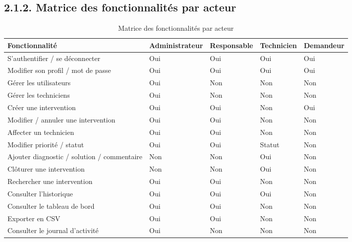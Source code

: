 \documentclass[11pt,a4paper]{report}
\begin{document}
\subsection*{2.1.2. Matrice des fonctionnalités par acteur}
\begin{table}[htbp]\centering\small
\begin{tabularx}{\textwidth}{|X|X|X|X|X|}
\hline\rowcolor{hdr}\textbf{Fonctionnalité} & \textbf{Administrateur} & \textbf{Responsable} & \textbf{Technicien} & \textbf{Demandeur}\\ \hline
S'authentifier / se déconnecter & Oui & Oui & Oui & Oui\\ \hline
Modifier son profil / mot de passe & Oui & Oui & Oui & Oui\\ \hline
Gérer les utilisateurs & Oui & Non & Non & Non\\ \hline
Gérer les techniciens & Oui & Non & Non & Non\\ \hline
Créer une intervention & Oui & Oui & Non & Oui\\ \hline
Modifier / annuler une intervention & Oui & Oui & Non & Non\\ \hline
Affecter un technicien & Oui & Oui & Non & Non\\ \hline
Modifier priorité / statut & Oui & Oui & Statut & Non\\ \hline
Ajouter diagnostic / solution / commentaire & Non & Non & Oui & Non\\ \hline
Clôturer une intervention & Non & Non & Oui & Non\\ \hline
Rechercher une intervention & Oui & Oui & Non & Non\\ \hline
Consulter l'historique & Oui & Oui & Oui & Non\\ \hline
Consulter le tableau de bord & Oui & Oui & Non & Non\\ \hline
Exporter en CSV & Oui & Oui & Non & Non\\ \hline
Consulter le journal d'activité & Oui & Non & Non & Non\\ \hline
\end{tabularx}
\caption{Matrice des fonctionnalités par acteur}
\end{table}
\end{document}
